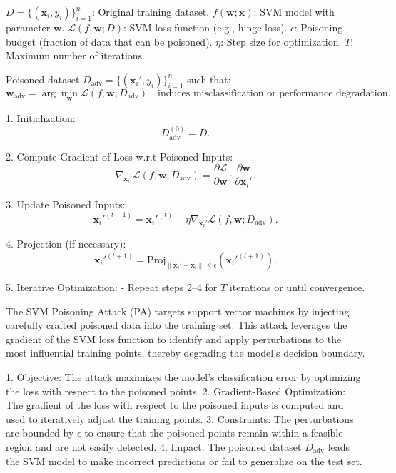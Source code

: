 $D = \{(\mathbf{x}_i, y_i)\}_{i=1}^n$: Original training dataset.
$f(\mathbf{w}; \mathbf{x})$: SVM model with parameter $\mathbf{w}$.
$\mathcal{L}(f, \mathbf{w}; D)$: SVM loss function (e.g., hinge loss).
$\epsilon$: Poisoning budget (fraction of data that can be poisoned).
$\eta$: Step size for optimization.
$T$: Maximum number of iterations.

Poisoned dataset $D_{\text{adv}} = \{(\mathbf{x}_i', y_i)\}_{i=1}^n$ such that:
\[
\mathbf{w}_{\text{adv}} = \arg \min_{\mathbf{w}} \mathcal{L}(f, \mathbf{w}; D_{\text{adv}})
\quad \text{induces misclassification or performance degradation.}
\]

1. Initialization:
   \[
   D_{\text{adv}}^{(0)} = D.
   \]

2. Compute Gradient of Loss w.r.t Poisoned Inputs:
   \[
   \nabla_{\mathbf{x}_i'} \mathcal{L}(f, \mathbf{w}; D_{\text{adv}}) = \frac{\partial \mathcal{L}}{\partial \mathbf{w}} \cdot \frac{\partial \mathbf{w}}{\partial \mathbf{x}_i'}.
   \]

3. Update Poisoned Inputs:
   \[
   \mathbf{x}_i'^{(t+1)} = \mathbf{x}_i'^{(t)} - \eta \nabla_{\mathbf{x}_i'} \mathcal{L}(f, \mathbf{w}; D_{\text{adv}}).
   \]

4. Projection (if necessary):
   \[
   \mathbf{x}_i'^{(t+1)} = \text{Proj}_{\|\mathbf{x}_i' - \mathbf{x}_i\| \leq \epsilon} (\mathbf{x}_i'^{(t+1)}).
   \]

5. Iterative Optimization:
   - Repeat steps 2–4 for $T$ iterations or until convergence.

The SVM Poisoning Attack (PA) targets support vector machines by injecting carefully crafted poisoned data into the training set. This attack leverages the gradient of the SVM loss function to identify and apply perturbations to the most influential training points, thereby degrading the model's decision boundary.

1. Objective: The attack maximizes the model's classification error by optimizing the loss with respect to the poisoned points.
2. Gradient-Based Optimization: The gradient of the loss with respect to the poisoned inputs is computed and used to iteratively adjust the training points.
3. Constraints: The perturbations are bounded by $\epsilon$ to ensure that the poisoned points remain within a feasible region and are not easily detected.
4. Impact: The poisoned dataset $D_{\text{adv}}$ leads the SVM model to make incorrect predictions or fail to generalize on the test set.